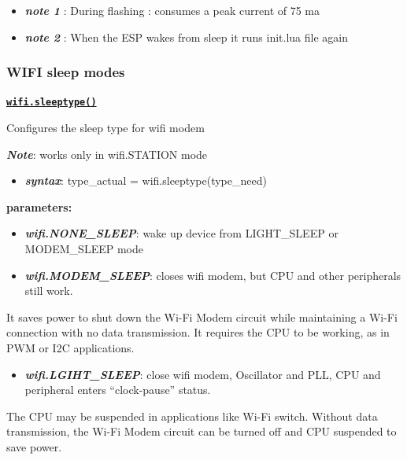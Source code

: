 \documentclass[16pt]{article}
\begin{document}
\begin{itemize}

\item
  \textbf{\emph{note 1}} : During flashing : consumes a peak current of 75
  ma
\item
  \textbf{\emph{note 2}} : When the ESP wakes from sleep it runs init.lua file again
\end{itemize}

\vspace{0.5cm}
\subsubsection{WIFI sleep modes}

\vspace{0.5cm}
{\underline{\texttt{\textbf{wifi.sleeptype()}}}}


\vspace{0.1cm}
  Configures the sleep type for wifi modem


\textbf{\emph{Note}}: works only in wifi.STATION mode

\begin{itemize}

\item
  \textbf{\emph{syntax}}: type\_actual = wifi.sleeptype(type\_need)
\end{itemize}

  \textbf{parameters:}

\begin{itemize}
\item
  \textbf{\emph{wifi.NONE\_SLEEP}}: wake up device from LIGHT\_SLEEP or MODEM\_SLEEP
  mode
\item
  \textbf{\emph{wifi.MODEM\_SLEEP}}: closes wifi modem, but CPU and other peripherals
  still work.
\end{itemize}

It saves power to shut down the Wi-Fi Modem circuit while maintaining a
Wi-Fi connection with no data transmission. It requires the CPU to be
working, as in PWM or I2C applications.

\begin{itemize}

\item
  \textbf{\emph{wifi.LGIHT\_SLEEP}}: close wifi modem, Oscillator and PLL, CPU and
  peripheral enters ``clock-pause'' status.
\end{itemize}

The CPU may be suspended in applications like Wi-Fi switch. Without data
transmission, the Wi-Fi Modem circuit can be turned off and CPU
suspended to save power.
\end{document}

